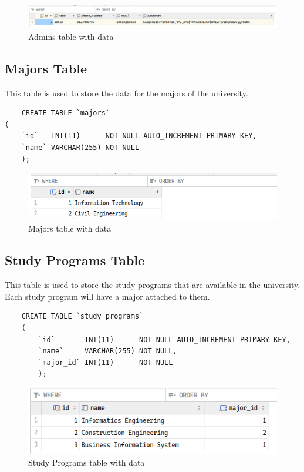 \documentclass[12pt,titlepage]{article}
\begin{document}
    \begin{figure}[h]
        \centering
        \includegraphics[width=\textwidth]{./images/admins-table.png}
        \caption{Admins table with data}
    \end{figure}

\subsection{Majors Table}
This table is used to store the data for the majors of the university.

\begin{verbatim}
    CREATE TABLE `majors`
(
    `id`   INT(11)      NOT NULL AUTO_INCREMENT PRIMARY KEY,
    `name` VARCHAR(255) NOT NULL
    );
\end{verbatim}

\begin{figure}[h]
    \centering
    \includegraphics[width=.6\textwidth]{./images/majors-table.png}
    \caption{Majors table with data}
\end{figure}

\subsection{Study Programs Table}
This table is used to store the study programs that are available in the university.
Each study program will have a major attached to them.

\begin{verbatim}
    CREATE TABLE `study_programs`
    (
        `id`       INT(11)      NOT NULL AUTO_INCREMENT PRIMARY KEY,
        `name`     VARCHAR(255) NOT NULL,
        `major_id` INT(11)      NOT NULL
        );
    \end{verbatim}
    
    \begin{figure}[h]
        \centering
        \includegraphics[width=.6\textwidth]{./images/study-programs-table.png}
        \caption{Study Programs table with data}
\end{figure}
\end{document}
